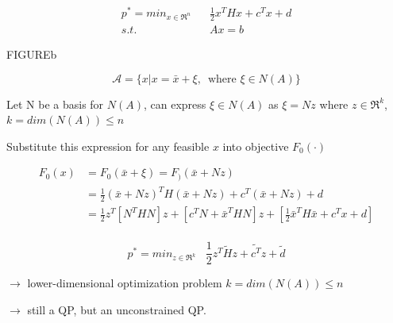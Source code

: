 \begin{align*}
p^* = min_{x\in \Re^n}\,\,\,\,\, &\frac{1}{2}x^THx + c^Tx + d\\
s.t.\,\,\,\,\, &Ax = b
\end{align*}


FIGUREb

\begin{equation*}
\mathcal{A} =\{x | x = \bar{x} + \xi,\,\,\, \text{where } \xi \in N(A) \}
\end{equation*}

Let N be a basis for $N(A)$, can express $\xi \in N(A)$ as $\xi = Nz$ where $z\in \Re^k$, $k =dim(N(A)) \leq n$


Substitute this expression for any feasible $x$ into objective $F_0(\cdot)$


\begin{align*}
F_0(x) &= F_0(\bar{x} + \xi) = F_)(\bar{x} + Nz)\\
&= \frac{1}{2}(\bar{x} + Nz)^TH(\bar{x}+Nz) + c^T(\bar{x} + Nz) + d\\
&= \frac{1}{2}z^T[N^THN]z + [c^TN + \bar{x}^THN]z + [\frac{1}{2}\bar{x}^TH\bar{x} + c^Tx + d] \\
\end{align*}

\begin{equation*}
p^* = min_{z\in \Re^k}\,\,\,\,\, \frac{1}{2}z^T\tilde{H}z + \tilde{c^T}z + \tilde{d}
\end{equation*}

$\rightarrow$ lower-dimensional optimization problem $k =dim(N(A)) \leq n $

$\rightarrow$ still a QP, but an unconstrained QP.



